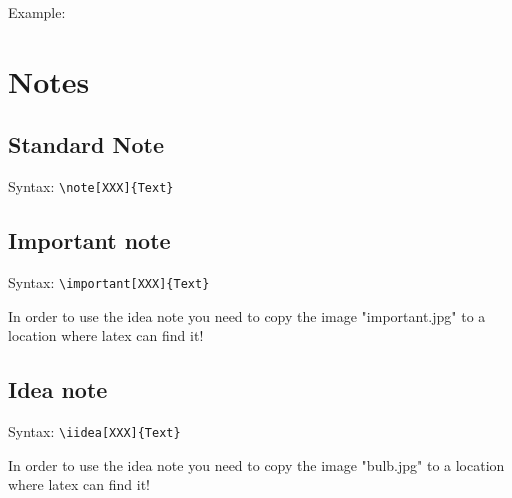 \documentclass[a4paper,12pt]{article}
\begin{document}
Example:

\section{Notes}

\subsection{Standard Note}

Syntax: \verb|\note[XXX]{Text}|


\subsection{Important note}

Syntax: \verb|\important[XXX]{Text}|


In order to use the idea note you need to copy the image "important.jpg" to a location where latex can find it!
\subsection{Idea note}

Syntax: \verb|\iidea[XXX]{Text}|


In order to use the idea note you need to copy the image "bulb.jpg" to a location where latex can find it!
\end{document}

